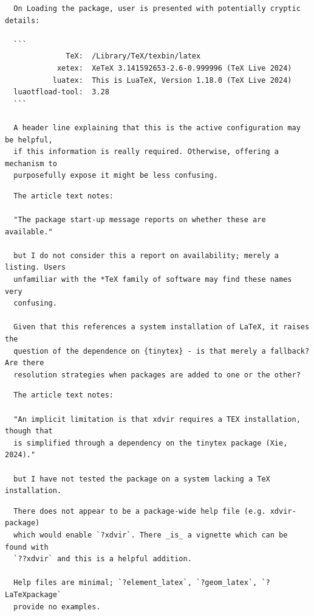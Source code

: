 \documentclass{article}
\begin{document}
\begin{verbatim}
  On Loading the package, user is presented with potentially cryptic details:
 
  ```
              TeX:  /Library/TeX/texbin/latex
            xetex:  XeTeX 3.141592653-2.6-0.999996 (TeX Live 2024)
           luatex:  This is LuaTeX, Version 1.18.0 (TeX Live 2024)
  luaotfload-tool:  3.28
  ```

  A header line explaining that this is the active configuration may be helpful,
  if this information is really required. Otherwise, offering a mechanism to
  purposefully expose it might be less confusing.
\end{verbatim}

\begin{verbatim}
  The article text notes:

  "The package start-up message reports on whether these are available."

  but I do not consider this a report on availability; merely a listing. Users
  unfamiliar with the *TeX family of software may find these names very 
  confusing.

  Given that this references a system installation of LaTeX, it raises the
  question of the dependence on {tinytex} - is that merely a fallback? Are there
  resolution strategies when packages are added to one or the other?
\end{verbatim}

\begin{verbatim}
  The article text notes:

  "An implicit limitation is that xdvir requires a TEX installation, though that
  is simplified through a dependency on the tinytex package (Xie, 2024)."

  but I have not tested the package on a system lacking a TeX installation.
\end{verbatim}

\begin{verbatim}
  There does not appear to be a package-wide help file (e.g. xdvir-package) 
  which would enable `?xdvir`. There _is_ a vignette which can be found with 
  `??xdvir` and this is a helpful addition.

  Help files are minimal; `?element_latex`, `?geom_latex`, `?LaTeXpackage` 
  provide no examples.
\end{verbatim}
\end{document}
